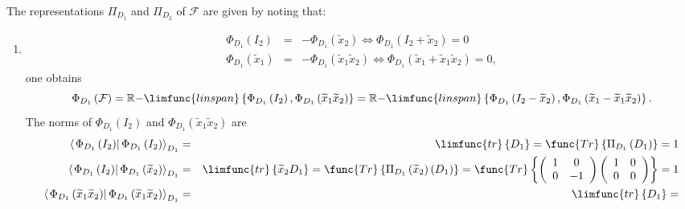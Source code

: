 \documentclass[aps,preprint]{revtex4}
\begin{document}
The representations $\Pi _{D_{1}}$ and $\Pi _{D_{2}}$ of $\mathcal{F}$ are
given by noting that:

\begin{enumerate}
\item 
\begin{eqnarray}
\Phi _{D_{1}}\left( I_{2}\right) &=&-\Phi _{D_{1}}\left( \widetilde{x}%
_{2}\right) \Leftrightarrow \Phi _{D_{1}}\left( I_{2}+\widetilde{x}%
_{2}\right) =0 \\
\Phi _{D_{1}}\left( \widetilde{x}_{1}\right) &=&-\Phi _{D_{1}}\left( 
\widetilde{x}_{1}\widetilde{x}_{2}\right) \Leftrightarrow \Phi
_{D_{1}}\left( \widetilde{x}_{1}+\widetilde{x}_{1}\widetilde{x}_{2}\right)
=0,
\end{eqnarray}%
one obtains%
\begin{equation}
\Phi _{D_{1}}\left( \mathcal{F}\right) =\mathbb{R-}\limfunc{linspan}\left\{
\Phi _{D_{1}}\left( I_{2}\right) ,\Phi _{D_{1}}\left( \widetilde{x}_{1}%
\widetilde{x}_{2}\right) \right\} =\mathbb{R-}\limfunc{linspan}\left\{ \Phi
_{D_{1}}\left( I_{2}-\widetilde{x}_{2}\right) ,\Phi _{D_{1}}\left( 
\widetilde{x}_{1}-\widetilde{x}_{1}\widetilde{x}_{2}\right) \right\} .
\end{equation}%
The norms of $\Phi _{D_{1}}\left( I_{2}\right) $ and $\Phi _{D_{1}}\left( 
\widetilde{x}_{1}\widetilde{x}_{2}\right) $ are%
\begin{eqnarray}
\left\langle \left. \Phi _{D_{1}}\left( I_{2}\right) \right\vert \Phi
_{D_{1}}\left( I_{2}\right) \right\rangle _{D_{1}} &=&\limfunc{tr}\left\{
D_{1}\right\} =\func{Tr}\left\{ \Pi _{D_{1}}\left( D_{1}\right) \right\} =1
\\
\left\langle \left. \Phi _{D_{1}}\left( I_{2}\right) \right\vert \Phi
_{D_{1}}\left( \widetilde{x}_{2}\right) \right\rangle _{D_{1}} &=&\limfunc{tr%
}\left\{ \widetilde{x}_{2}D_{1}\right\} =\func{Tr}\left\{ \Pi _{D_{1}}\left( 
\widetilde{x}_{2}\right) \left( D_{1}\right) \right\} =\func{Tr}\left\{
\left( 
\begin{array}{cc}
1 & 0 \\ 
0 & -1%
\end{array}%
\right) \left( 
\begin{array}{cc}
1 & 0 \\ 
0 & 0%
\end{array}%
\right) \right\} =1 \\
\left\langle \left. \Phi _{D_{1}}\left( \widetilde{x}_{1}\widetilde{x}%
_{2}\right) \right\vert \Phi _{D_{1}}\left( \widetilde{x}_{1}\widetilde{x}%
_{2}\right) \right\rangle _{D_{1}} &=&\limfunc{tr}\left\{ D_{1}\right\} =%

\end{eqnarray}
\end{enumerate}
\end{document}
